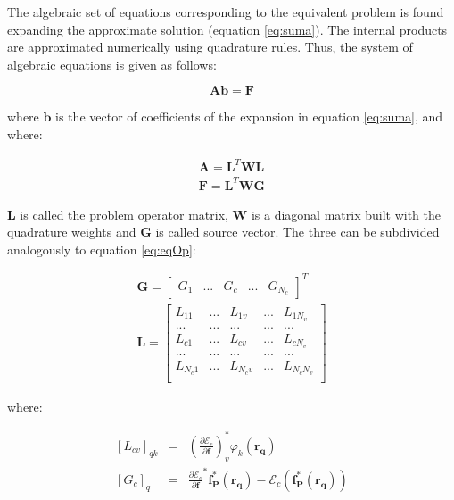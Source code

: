 \documentclass{CFD2011}
\begin{document}
The algebraic set of equations corresponding to the equivalent problem is found expanding the approximate solution (equation \ref{eq:suma}). The internal products are approximated numerically using quadrature rules. Thus, the system of algebraic equations is given as follows:

\begin{equation}
\mathbf{A} \mathbf{b} = \mathbf{F}
\end{equation}

\noindent where $\mathbf{b}$ is the vector of coefficients of the expansion in equation \ref{eq:suma}, and where:

\begin{eqnarray}
\mathbf{A}=\mathbf{L}^T\mathbf{W}\mathbf{L} \nonumber \\
\mathbf{F}=\mathbf{L}^T\mathbf{W}\mathbf{G} \nonumber
\end{eqnarray}

$\mathbf{L}$ is called the problem operator matrix, $\mathbf{W}$ is a diagonal matrix built with the quadrature weights and $\mathbf{G}$ is called source vector. The three can be subdivided analogously to equation \ref{eq:eqOp}:

\begin{eqnarray}
\mathbf{G}=\left[ \begin{array}{ccccc} G_1 & ... & G_{c} & ... & G_{N_c} \end{array} \right]^T \nonumber\\
\mathbf{L}=\left[ \begin{array}{ccccc}
L_{11} & ... & L_{1v} & ... & L_{1N_v} \\
... & ... & ... & ... & ... \\
L_{c1} & ... & L_{cv} & ... & L_{cN_v} \\
... & ... & ... & ... & ... \\
L_{N_c1} & ... & L_{N_cv} & ... & L_{N_cN_v} \\
\end{array} \right] 
\end{eqnarray}

\noindent where:

\begin{eqnarray}
\left[L_{cv}\right]_{qk}&=&\left(\frac{\partial \mathcal{E}_c}{\partial \mathbf{f}}\right)^*_v \varphi_k (\mathbf{r_q}) \nonumber \\
\left[G_{c}\right]_{q}&=&\frac{\partial \mathcal{E}_c}{\partial \mathbf{f}}^*\mathbf{f_P^*}(\mathbf{r_q})-\mathcal{E}_c(\mathbf{f_P^*}(\mathbf{r_q}))
\end{eqnarray}
\end{document}
